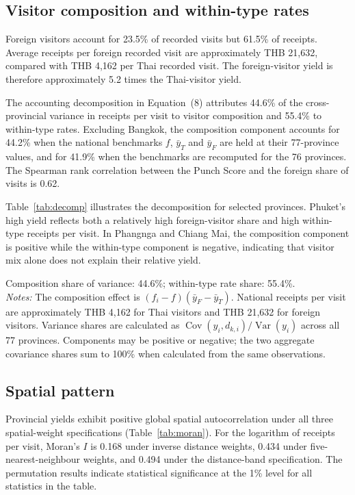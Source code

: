 \documentclass[11pt,a4paper]{article}
\begin{document}
\subsection{Visitor composition and within-type rates}
Foreign visitors account for 23.5\% of recorded visits but 61.5\% of receipts. Average receipts per foreign recorded visit are approximately THB 21,632, compared with THB 4,162 per Thai recorded visit. The foreign-visitor yield is therefore approximately 5.2 times the Thai-visitor yield.

The accounting decomposition in Equation~(8) attributes 44.6\% of the cross-provincial variance in receipts per visit to visitor composition and 55.4\% to within-type rates. Excluding Bangkok, the composition component accounts for 44.2\% when the national benchmarks $f$, $\bar y_T$ and $\bar y_F$ are held at their 77-province values, and for 41.9\% when the benchmarks are recomputed for the 76 provinces. The Spearman rank correlation between the Punch Score and the foreign share of visits is 0.62.

Table~\ref{tab:decomp} illustrates the decomposition for selected provinces. Phuket's high yield reflects both a relatively high foreign-visitor share and high within-type receipts per visit. In Phangnga and Chiang Mai, the composition component is positive while the within-type component is negative, indicating that visitor mix alone does not explain their relative yield.

\begin{table}[t]\centering\scriptsize
\caption{Composition and within-type decomposition of receipts per visit for selected provinces, 2024}\label{tab:decomp}
\resizebox{\textwidth}{!}{}\par\smallskip
\parbox{\textwidth}{\scriptsize Composition share of variance: 44.6\%; within-type rate share: 55.4\%.\\
\emph{Notes:} The composition effect is $(f_i-f)(\bar y_F-\bar y_T)$. National receipts per visit are approximately THB 4,162 for Thai visitors and THB 21,632 for foreign visitors. Variance shares are calculated as $\operatorname{Cov}(y_i,d_{k,i})/\operatorname{Var}(y_i)$ across all 77 provinces. Components may be positive or negative; the two aggregate covariance shares sum to 100\% when calculated from the same observations.}
\end{table}

\subsection{Spatial pattern}
Provincial yields exhibit positive global spatial autocorrelation under all three spatial-weight specifications (Table~\ref{tab:moran}). For the logarithm of receipts per visit, Moran's $I$ is 0.168 under inverse distance weights, 0.434 under five-nearest-neighbour weights, and 0.494 under the distance-band specification. The permutation results indicate statistical significance at the 1\% level for all statistics in the table.
\end{document}
